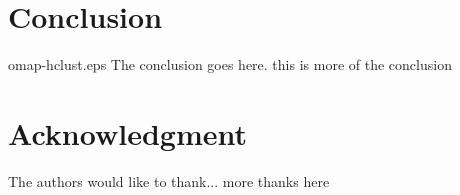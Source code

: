 \documentclass[10pt, conference, compsocconf]{IEEEtran}
\begin{document}



\section{Conclusion}omap-hclust.eps
The conclusion goes here. this is more of the conclusion



\section*{Acknowledgment}


The authors would like to thank...
more thanks here




\balance



%
%


%
%




\end{document}
